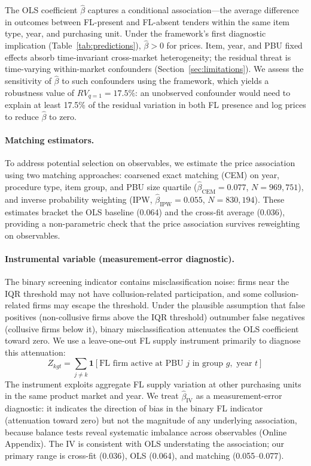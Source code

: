 The OLS coefficient $\hat{\beta}$ captures a conditional
association---the average difference in outcomes between FL-present and
FL-absent tenders within the same item type, year, and purchasing unit.
Under the framework's first diagnostic implication (Table~\ref{tab:predictions}), $\hat{\beta} > 0$ for prices.
Item, year, and PBU fixed effects absorb time-invariant cross-market
heterogeneity; the residual threat is time-varying within-market
confounders (Section~\ref{sec:limitations}). We assess the sensitivity
of $\hat{\beta}$ to such confounders using the
\citet{cinelli2020making} framework, which yields a robustness value
of $RV_{q=1} = 17.5\%$: an unobserved confounder would need to
explain at least 17.5\% of the residual variation in both FL presence
and log prices to reduce $\hat{\beta}$ to zero.

\paragraph{Matching estimators.}
To address potential selection on observables, we estimate the
price association using two matching approaches: coarsened exact
matching (CEM) on year, procedure type, item group, and PBU size
quartile ($\hat{\beta}_{\text{CEM}} = 0.077$, $N = 969{,}751$), and
inverse probability weighting (IPW, $\hat{\beta}_{\text{IPW}} = 0.055$,
$N = 830{,}194$). These estimates bracket the OLS baseline (0.064)
and the cross-fit average (0.036), providing a non-parametric check
that the price association survives reweighting on observables.

\paragraph{Instrumental variable (measurement-error diagnostic).}
The binary screening indicator contains misclassification noise:
firms near the IQR threshold may not have collusion-related
participation, and some collusion-related firms may escape the
threshold. Under the plausible assumption that false positives (non-collusive
firms above the IQR threshold) outnumber false negatives (collusive
firms below it), binary misclassification attenuates the OLS
coefficient toward zero. We use a leave-one-out FL supply instrument
primarily to diagnose this attenuation:
\begin{equation}
  Z_{kgt} = \sum_{j \neq k} \mathbf{1}[\text{FL firm active at PBU } j
  \text{ in group } g, \text{ year } t]
  \label{eq:iv_v6}
\end{equation}
The instrument exploits aggregate FL supply variation at other
purchasing units in the same product market and year. We treat
$\hat{\beta}_{\text{IV}}$ as a measurement-error diagnostic: it
indicates the direction of bias in the binary FL indicator
(attenuation toward zero) but not the magnitude of any underlying association, because
balance tests reveal systematic imbalance across observables
(Online Appendix). The IV
is consistent with OLS understating the association; our primary range is
cross-fit (0.036), OLS (0.064), and matching (0.055--0.077).

